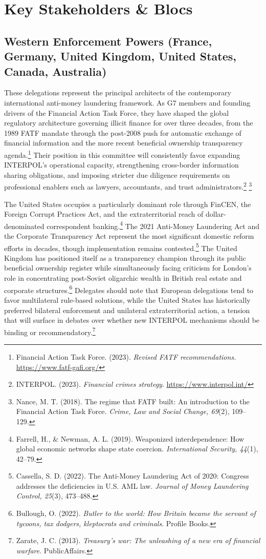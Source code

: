 \section{Key Stakeholders \& Blocs}

\subsection{Western Enforcement Powers (France, Germany, United Kingdom, United States, Canada, Australia)}

These delegations represent the principal architects of the contemporary international anti-money laundering framework. As G7 members and founding drivers of the Financial Action Task Force, they have shaped the global regulatory architecture governing illicit finance for over three decades, from the 1989 FATF mandate through the post-2008 push for automatic exchange of financial information and the more recent beneficial ownership transparency agenda.\footnote{Financial Action Task Force. (2023). \emph{Revised FATF recommendations}. \url{https://www.fatf-gafi.org/}} Their position in this committee will consistently favor expanding INTERPOL's operational capacity, strengthening cross-border information sharing obligations, and imposing stricter due diligence requirements on professional enablers such as lawyers, accountants, and trust administrators.\footnote{INTERPOL. (2023). \emph{Financial crimes strategy}. \url{https://www.interpol.int/}} \footnote{Nance, M. T. (2018). The regime that FATF built: An introduction to the Financial Action Task Force. \emph{Crime, Law and Social Change, 69}(2), 109–129.}

The United States occupies a particularly dominant role through FinCEN, the Foreign Corrupt Practices Act, and the extraterritorial reach of dollar-denominated correspondent banking.\footnote{Farrell, H., \& Newman, A. L. (2019). Weaponized interdependence: How global economic networks shape state coercion. \emph{International Security, 44}(1), 42–79.} The 2021 Anti-Money Laundering Act and the Corporate Transparency Act represent the most significant domestic reform efforts in decades, though implementation remains contested.\footnote{Cassella, S. D. (2022). The Anti-Money Laundering Act of 2020: Congress addresses the deficiencies in U.S. AML law. \emph{Journal of Money Laundering Control, 25}(3), 473–488.} The United Kingdom has positioned itself as a transparency champion through its public beneficial ownership register while simultaneously facing criticism for London's role in concentrating post-Soviet oligarchic wealth in British real estate and corporate structures.\footnote{Bullough, O. (2022). \emph{Butler to the world: How Britain became the servant of tycoons, tax dodgers, kleptocrats and criminals}. Profile Books.} Delegates should note that European delegations tend to favor multilateral rule-based solutions, while the United States has historically preferred bilateral enforcement and unilateral extraterritorial action, a tension that will surface in debates over whether new INTERPOL mechanisms should be binding or recommendatory.\footnote{Zarate, J. C. (2013). \emph{Treasury's war: The unleashing of a new era of financial warfare}. PublicAffairs.}

